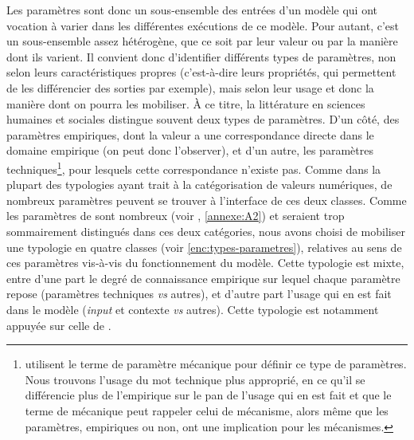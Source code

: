 Les paramètres sont donc un sous-ensemble des entrées d'un modèle qui ont vocation à varier dans les différentes exécutions de ce modèle.
Pour autant, c'est un sous-ensemble assez hétérogène, que ce soit par leur valeur ou par la manière dont ils varient.
Il convient donc d'identifier différents types de paramètres, non selon leurs caractéristiques propres (c'est-à-dire leurs propriétés, qui permettent de les différencier des sorties par exemple), mais selon leur usage et donc la manière dont on pourra les mobiliser.
À ce titre, la littérature en sciences humaines et sociales
distingue souvent deux types de paramètres.
D'un côté, des paramètres empiriques, dont la valeur a une correspondance directe dans le domaine empirique (on peut donc l'observer), et d'un autre, les paramètres techniques\footnote{
		\textcite{mathian_formalisation_2015} utilisent le terme de paramètre mécanique pour définir ce type de paramètres.
		Nous trouvons l'usage du mot \og technique\fg{} plus approprié, en ce qu'il se différencie plus de l'empirique sur le pan de l'usage qui en est fait et que le terme de \og mécanique\fg{} peut rappeler celui de mécanisme, alors même que les paramètres, empiriques ou non, ont une implication pour les mécanismes.
}, pour lesquels cette correspondance n'existe pas.
Comme dans la plupart des typologies ayant trait à la catégorisation de valeurs numériques, de nombreux paramètres peuvent se trouver à l'interface de ces deux classes.
Comme les paramètres de \simfeodal{} sont nombreux (voir , \cref{annexe:A2}) et seraient trop sommairement distingués dans ces deux catégories, nous avons choisi de mobiliser une typologie en quatre classes (voir \cref{enc:types-parametres}), relatives au sens de ces paramètres vis-à-vis du fonctionnement du modèle.
Cette typologie est mixte, entre d'une part le degré de connaissance empirique sur lequel chaque paramètre repose (paramètres techniques \textit{vs} autres), et d'autre part l'usage qui en est fait dans le modèle (\textit{input} et contexte \textit{vs} autres).
Cette typologie est notamment appuyée sur celle de \textcite[45]{tannier_analyse_2017}.


